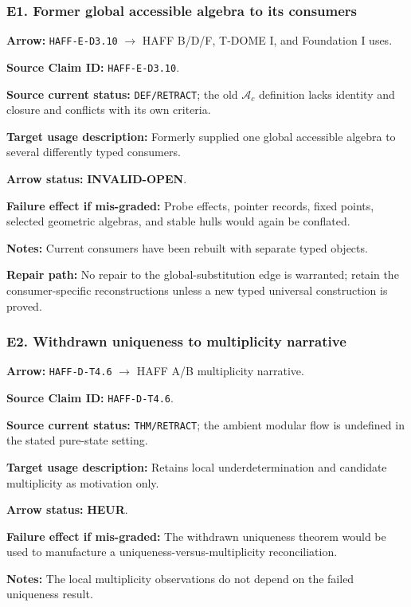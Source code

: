 \documentclass[12pt,a4paper]{article}
\begin{document}
\subsubsection*{E1. Former global accessible algebra to its consumers}
\noindent\textbf{Arrow:} \texttt{HAFF-E-D3.10}
\(\to\) HAFF B/D/F, T-DOME I, and Foundation I uses.\par
\noindent\textbf{Source Claim ID:} \texttt{HAFF-E-D3.10}.\par
\noindent\textbf{Source current status:} \texttt{DEF/RETRACT}; the old
\(\mathcal A_c\) definition lacks identity and closure and conflicts with
its own criteria.\par
\noindent\textbf{Target usage description:} Formerly supplied one global
accessible algebra to several differently typed consumers.\par
\noindent\textbf{Arrow status:} \textbf{INVALID-OPEN}.\par
\noindent\textbf{Failure effect if mis-graded:} Probe effects, pointer
records, fixed points, selected geometric algebras, and stable hulls would
again be conflated.\par
\noindent\textbf{Notes:} Current consumers have been rebuilt with
separate typed objects.\par
\noindent\textbf{Repair path:} No repair to the global-substitution edge
is warranted; retain the consumer-specific reconstructions unless a new
typed universal construction is proved.\par

\subsubsection*{E2. Withdrawn uniqueness to multiplicity narrative}
\noindent\textbf{Arrow:} \texttt{HAFF-D-T4.6}
\(\to\) HAFF A/B multiplicity narrative.\par
\noindent\textbf{Source Claim ID:} \texttt{HAFF-D-T4.6}.\par
\noindent\textbf{Source current status:} \texttt{THM/RETRACT}; the
ambient modular flow is undefined in the stated pure-state setting.\par
\noindent\textbf{Target usage description:} Retains local
underdetermination and candidate multiplicity as motivation only.\par
\noindent\textbf{Arrow status:} \textbf{HEUR}.\par
\noindent\textbf{Failure effect if mis-graded:} The withdrawn uniqueness
theorem would be used to manufacture a uniqueness-versus-multiplicity
reconciliation.\par
\noindent\textbf{Notes:} The local multiplicity observations do not
depend on the failed uniqueness result.\par
\end{document}
